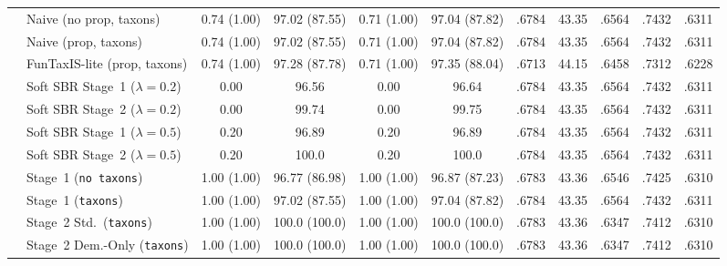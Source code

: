 \begin{table}[!h]
\begin{tabular}{ll cc cc ccccc}
 & Naive (no prop, taxons)          & 0.74 (1.00) & 97.02 (87.55) & 0.71 (1.00) & 97.04 (87.82) & .6784 & 43.35 & .6564 & .7432 & .6311 \\
 & Naive (prop, taxons)             & 0.74 (1.00) & 97.02 (87.55) & 0.71 (1.00) & 97.04 (87.82) & .6784 & 43.35 & .6564 & .7432 & .6311 \\
 & FunTaxIS-lite (prop, taxons)     & 0.74 (1.00) & 97.28 (87.78) & 0.71 (1.00) & 97.35 (88.04) & .6713 & 44.15 & .6458 & .7312 & .6228 \\
 & Soft SBR Stage~1 ($\lambda=0.2$) & 0.00 & 96.56 & 0.00 & 96.64 & .6784 & 43.35 & .6564 & .7432 & .6311 \\
 & Soft SBR Stage~2 ($\lambda=0.2$) & 0.00 & 99.74 & 0.00 & 99.75 & .6784 & 43.35 & .6564 & .7432 & .6311 \\
 & Soft SBR Stage~1 ($\lambda=0.5$) & 0.20 & 96.89 & 0.20 & 96.89 & .6784 & 43.35 & .6564 & .7432 & .6311 \\
 & Soft SBR Stage~2 ($\lambda=0.5$) & 0.20 & 100.0 & 0.20 & 100.0 & .6784 & 43.35 & .6564 & .7432 & .6311 \\
 & Stage~1 (\texttt{no taxons})     & 1.00 (1.00) & 96.77 (86.98) & 1.00 (1.00) & 96.87 (87.23) & .6783 & 43.36 & .6546 & .7425 & .6310 \\
 & Stage~1 (\texttt{taxons})        & 1.00 (1.00) & 97.02 (87.55) & 1.00 (1.00) & 97.04 (87.82) & .6784 & 43.35 & .6564 & .7432 & .6311 \\
 & Stage~2 Std.\ (\texttt{taxons})  & 1.00 (1.00) & 100.0 (100.0) & 1.00 (1.00) & 100.0 (100.0) & .6783 & 43.36 & .6347 & .7412 & .6310 \\
 & Stage~2 Dem.-Only (\texttt{taxons}) & 1.00 (1.00) & 100.0 (100.0) & 1.00 (1.00) & 100.0 (100.0) & .6783 & 43.36 & .6347 & .7412 & .6310 \\
\bottomrule
\end{tabular}
\end{table}
